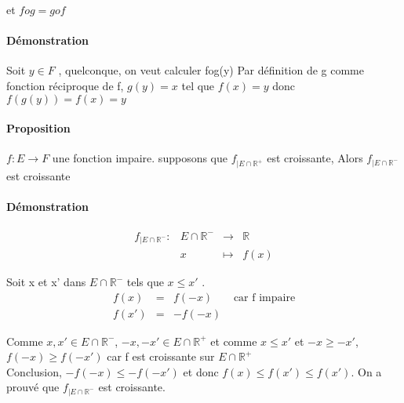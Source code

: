 et $fog = gof$

\paragraph{Démonstration} 
Soit $y \in F$ , quelconque, on veut calculer fog(y)
Par définition de g comme fonction réciproque de f, $g(y) = x$ tel que $f(x) = y$ donc $f(g(y)) = f(x) = y$

\paragraph{Proposition} $f:E\rightarrow F$ une fonction impaire. supposons que $f_{| E \cap \mathbb{R}^+}$ est croissante, Alors $f_{|E \cap \mathbb{R}^-}$ est croissante

\paragraph{Démonstration} 
\[\begin{array}{rccl}
	f_{|E\cap \mathbb{R}^-} : & E\cap \mathbb{R}^- &\rightarrow &\mathbb{R}\\
												 & x & \mapsto & f(x)
\end{array}\]

Soit x et x' dans $E \cap \mathbb{R}^-$ tels que $x \leq x'$ . 
\[\begin{array}{rccl}
	f(x) & = & f(-x) & \text{ car f impaire} \\
	f(x') & = & -f(-x)
\end{array}\]

Comme $x, x' \in E \cap \mathbb{R}^-$, $-x, -x' \in E \cap \mathbb{R}^+$ et comme $x \leq x'$ et $-x \geq -x'$, $f(-x) \geq f(-x')$ car f est croissante sur $E\cap \mathbb{R}^+$ ~\\
Conclusion, $-f(-x) \leq -f(-x')$ et donc $f(x) \leq f(x') \leq f(x')$. On a prouvé que $f_{|E \cap \mathbb{R}^-}$ est croissante.
